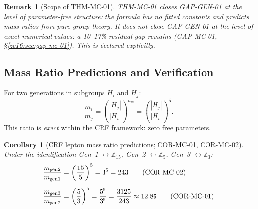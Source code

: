 \documentclass[12pt, a4paper]{article}
\newtheorem{corollary}{Corollary}[section]
\newtheorem{remark}{Remark}[section]
\begin{document}
\begin{remark}[Scope of THM-MC-01]
THM-MC-01 closes GAP-GEN-01 at the level of parameter-free
\emph{structure}: the formula has no fitted constants and
predicts mass ratios from pure group theory. It does not
close GAP-GEN-01 at the level of exact numerical values:
a 10--17\% residual gap remains (GAP-MC-01,
\S\ref{zc16:sec:gap-mc-01}). This is declared explicitly.
\end{remark}

\subsection{Mass Ratio Predictions and Verification}
\label{zc16:sec:verification}

\begin{derivedbox}[title={EQ-MC-04: Mass ratio formula}]
For two generations in subgroups $H_i$ and $H_j$:
\begin{equation}
  \frac{m_i}{m_j} = \left(\frac{|H_j|}{|H_i|}\right)^{n_m}
  = \left(\frac{|H_j|}{|H_i|}\right)^5.
  \tag{EQ-MC-04}\label{zc16:eq:mass-ratio}
\end{equation}
This ratio is \emph{exact} within the CRF framework:
zero free parameters.
\end{derivedbox}

\begin{corollary}[CRF lepton mass ratio predictions;
  COR-MC-01, COR-MC-02]
\label{zc16:cor:lepton-ratios}
Under the identification Gen~1 $\leftrightarrow \mathbb{Z}_{15}$,
Gen~2 $\leftrightarrow \mathbb{Z}_5$, Gen~3 $\leftrightarrow
\mathbb{Z}_3$:
\begin{align}
  \frac{m_{\rm gen2}}{m_{\rm gen1}}
  &= \left(\frac{15}{5}\right)^5 = 3^5 = 243
  \tag{COR-MC-02}\label{zc16:eq:gen2-gen1}\\[4pt]
  \frac{m_{\rm gen3}}{m_{\rm gen2}}
  &= \left(\frac{5}{3}\right)^5 = \frac{5^5}{3^5}
  = \frac{3125}{243} \approx 12.86
  \tag{COR-MC-01}\label{zc16:eq:gen3-gen2}
\end{align}
\end{corollary}
\end{document}

